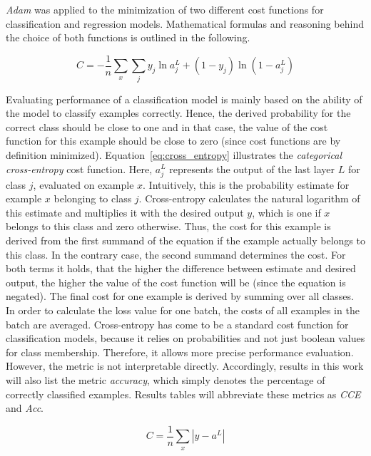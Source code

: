 \textit{Adam} was applied to the minimization of two different cost functions for
classification and regression models.
Mathematical formulas and reasoning behind the choice of both functions
is outlined in the following.

\begin{equation}
  \label{eq:cross_entropy}
  C = -\frac{1}{n} \sum_x \sum_j y_j \ln a_j^L + (1 - y_j) \ln (1 - a_j^L)
\end{equation}

Evaluating performance of a classification model is mainly based on the ability
of the model to classify examples correctly.
Hence, the derived probability for the correct class should be close to one and
in that case, the value of the cost function for this example should be close
to zero (since cost functions are by definition minimized).
Equation~\ref{eq:cross_entropy} illustrates the \textit{categorical cross-entropy}
cost function. Here, $a_j^L$ represents the output of the last layer $L$ for class $j$,
evaluated on example $x$.
Intuitively, this is the probability estimate for example $x$ belonging to class $j$.
Cross-entropy calculates the natural logarithm of this estimate and multiplies
it with the desired output $y$, which is one if $x$ belongs to this class and
zero otherwise.
Thus, the cost for this example is derived from the first summand of the equation
if the example actually belongs to this class.
In the contrary case, the second summand determines the cost.
For both terms it holds, that the higher the difference between estimate and desired
output, the higher the value of the cost function will be (since the equation is negated).
The final cost for one example is derived by summing over all classes.
In order to calculate the loss value for one batch, the costs of all examples
in the batch are averaged.
Cross-entropy has come to be a standard cost function for classification
models, because it relies on probabilities and not just boolean values for class
membership.
Therefore, it allows more precise performance evaluation.
However, the metric is not interpretable directly.
Accordingly, results in this work will also list the metric \textit{accuracy}, which simply
denotes the percentage of correctly classified examples.
Results tables will abbreviate these metrics as \textit{CCE} and \textit{Acc}.

\begin{equation}
  \label{eq:mae}
  C = \frac{1}{n} \sum_x |y - a^L|
\end{equation}

